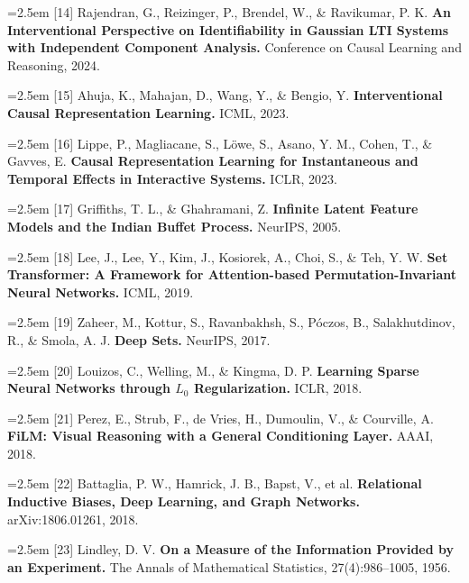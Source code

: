 \documentclass[11pt]{article}
\begin{document}
\noindent\hangindent=2.5em [14] Rajendran, G., Reizinger, P., Brendel, W., \& Ravikumar, P. K. \textbf{An Interventional Perspective on Identifiability in Gaussian LTI Systems with Independent Component Analysis.} Conference on Causal Learning and Reasoning, 2024.\par

\noindent\hangindent=2.5em [15] Ahuja, K., Mahajan, D., Wang, Y., \& Bengio, Y. \textbf{Interventional Causal Representation Learning.} ICML, 2023.\par

\noindent\hangindent=2.5em [16] Lippe, P., Magliacane, S., L\"owe, S., Asano, Y. M., Cohen, T., \& Gavves, E. \textbf{Causal Representation Learning for Instantaneous and Temporal Effects in Interactive Systems.} ICLR, 2023.\par

\noindent\hangindent=2.5em [17] Griffiths, T. L., \& Ghahramani, Z. \textbf{Infinite Latent Feature Models and the Indian Buffet Process.} NeurIPS, 2005.\par

\noindent\hangindent=2.5em [18] Lee, J., Lee, Y., Kim, J., Kosiorek, A., Choi, S., \& Teh, Y. W. \textbf{Set Transformer: A Framework for Attention-based Permutation-Invariant Neural Networks.} ICML, 2019.\par

\noindent\hangindent=2.5em [19] Zaheer, M., Kottur, S., Ravanbakhsh, S., P\'oczos, B., Salakhutdinov, R., \& Smola, A. J. \textbf{Deep Sets.} NeurIPS, 2017.\par

\noindent\hangindent=2.5em [20] Louizos, C., Welling, M., \& Kingma, D. P. \textbf{Learning Sparse Neural Networks through $L_0$ Regularization.} ICLR, 2018.\par

\noindent\hangindent=2.5em [21] Perez, E., Strub, F., de Vries, H., Dumoulin, V., \& Courville, A. \textbf{FiLM: Visual Reasoning with a General Conditioning Layer.} AAAI, 2018.\par

\noindent\hangindent=2.5em [22] Battaglia, P. W., Hamrick, J. B., Bapst, V., et al. \textbf{Relational Inductive Biases, Deep Learning, and Graph Networks.} arXiv:1806.01261, 2018.\par

\noindent\hangindent=2.5em [23] Lindley, D. V. \textbf{On a Measure of the Information Provided by an Experiment.} The Annals of Mathematical Statistics, 27(4):986--1005, 1956.\par
\end{document}
